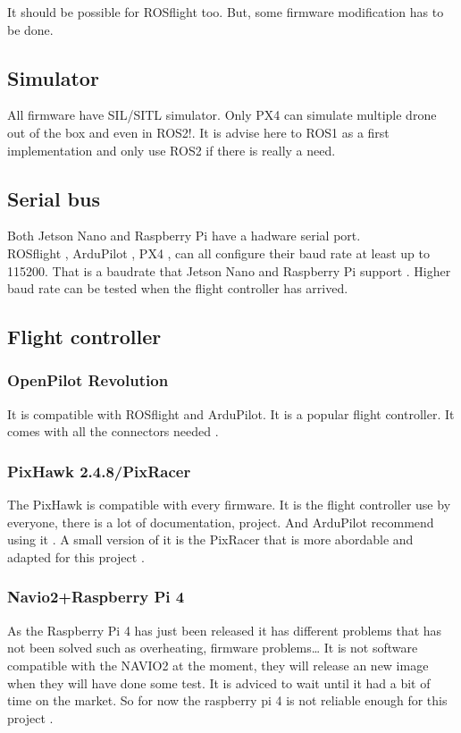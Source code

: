 It should be possible for ROSflight \cite{github_rosflight_100} too.
But, some firmware modification has to be done.

\subsection{Simulator}
All firmware have SIL/SITL simulator.
Only PX4 can simulate multiple drone out of the box {\color{red}and even in ROS2!}. It is advise here \cite{px4_ros2} to ROS1 as a first implementation and only use ROS2 if there is really a need.

\subsection{Serial bus}
Both Jetson Nano and Raspberry Pi have a hadware serial port.\\
ROSflight \cite{rosflight_parameters},
ArduPilot \cite{ardupilot_serial_parameters},
PX4 \cite{px4_serial_parameters},
can all configure their baud rate at least up to 115200. That is a baudrate that
Jetson Nano \cite{jetsonhacks_serial}
and
Raspberry Pi support \cite{rpi_stackexchange_serial}.
Higher baud rate can be tested when the flight controller has arrived.



\subsection{Flight controller}
\subsubsection{OpenPilot Revolution}
It is compatible with ROSflight and ArduPilot. It is a popular flight controller.
It comes with all the connectors needed \cite{bangood_revo}.


\subsubsection{PixHawk 2.4.8/PixRacer}
The PixHawk is compatible with every firmware.
It is the flight controller use by everyone, there is a lot of documentation, project. And ArduPilot recommend using it \cite{ardupilot_choose_fc}.
A small version of it is the PixRacer that is more abordable and adapted for this project \cite{mrobotics_pixracer}.

\subsubsection{Navio2+Raspberry Pi 4}
As the Raspberry Pi 4 has just been released it has different problems that has not been solved such as overheating, firmware problems… It is not software compatible with the NAVIO2 at the moment, they will release an new image when they will have done some test. It is adviced to wait until it had a bit of time on the market. So for now the raspberry pi 4 is not reliable enough for this project \cite{ardupilot_rpi_compatibility}.

